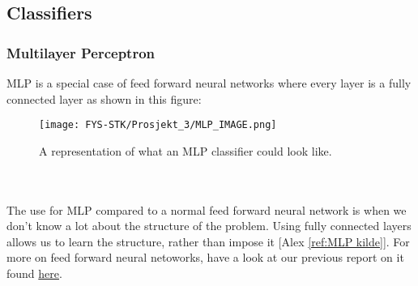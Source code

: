 \documentclass[english,notitlepage,reprint,nofootinbib]{revtex4-1}  %
\begin{document}
\subsection{Classifiers}
\subsubsection{Multilayer Perceptron}
MLP is a special case of feed forward neural networks where every layer is a fully connected layer as shown in this figure:

\begin{figure}[H]
    \centering
    \texttt{[image: FYS-STK/Prosjekt\_3/MLP\_IMAGE.png]}
    \caption{A representation of what an MLP classifier could look like.}
    \label{fig: 1}
\end{figure}
\\
\\
The use for MLP compared to a normal feed forward neural network is when we don't know a lot about the structure of the problem. Using fully connected layers allows us to learn the structure, rather than impose it [Alex \ref{ref:MLP kilde}]. 
For more on feed forward neural netoworks, have a look at our previous report on it found \href{https://github.com/erlend1202/FYS_STK4155_Prosjekt_2}{here}.


\end{document}
